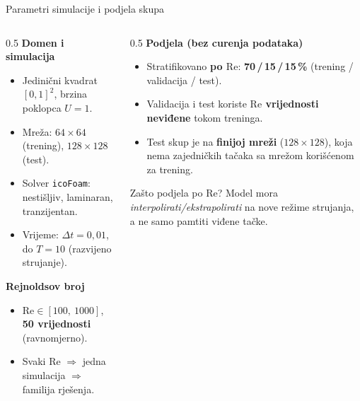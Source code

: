 \documentclass[10pt,aspectratio=169]{beamer}
\begin{document}
\begin{frame}{Parametri simulacije i podjela skupa}
  \begin{columns}[T]
    \begin{column}{0.5\textwidth}
      \small
      \textbf{Domen i simulacija}
      \begin{itemize}
        \item Jedinični kvadrat $[0,1]^2$, brzina poklopca $U=1$.
        \item Mreža: \textbf{$64\times64$} (trening), \textbf{$128\times128$} (test).
        \item Solver \texttt{icoFoam}: nestišljiv, laminaran, tranzijentan.
        \item Vrijeme: $\Delta t = 0{,}01$, do $T=10$ (razvijeno strujanje).
      \end{itemize}
      \medskip
      \textbf{Rejnoldsov broj}
      \begin{itemize}
        \item $\mathrm{Re}\in[100,\ 1000]$, \textbf{50 vrijednosti} (ravnomjerno).
        \item Svaki $\mathrm{Re}$ $\Rightarrow$ jedna simulacija $\Rightarrow$ familija rješenja.
      \end{itemize}
    \end{column}
    \begin{column}{0.5\textwidth}
      \small
      \textbf{Podjela (bez curenja podataka)}
      \begin{itemize}
        \item Stratifikovano \textbf{po $\mathrm{Re}$}: \textbf{70\,/\,15\,/\,15\,\%}
              (trening / validacija / test).
        \item Validacija i test koriste \textbf{$\mathrm{Re}$ vrijednosti neviđene}
              tokom treninga.
        \item Test skup je na \textbf{finijoj mreži} ($128\times128$), koja nema zajedničkih tačaka sa mrežom korišćenom za trening.
      \end{itemize}
      \vfill
      \begin{block}{Zašto podjela po $\mathrm{Re}$?}
        Model mora \emph{interpolirati/ekstrapolirati} na nove režime strujanja,
        a ne samo pamtiti viđene tačke.
      \end{block}
    \end{column}
  \end{columns}
\end{frame}
\end{document}
